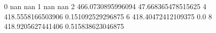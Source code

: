 0 nan nan
1 nan nan
2 466.0730895996094 47.668365478515625
4 418.5558166503906 0.151092529296875
6 418.40472412109375 0.0
8 418.9205627441406 0.515838623046875
